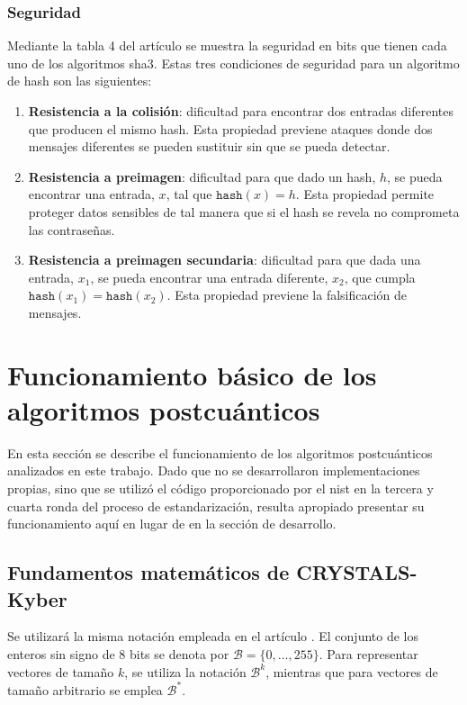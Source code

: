 \subsubsection{Seguridad}
Mediante la tabla 4 del artículo \cite{FIPS202} se muestra la seguridad en bits que tienen cada uno de los algoritmos \gls{sha}3. Estas tres condiciones de seguridad para un algoritmo de hash son las siguientes:
\begin{enumerate}
	\item \textbf{Resistencia a la colisión}: dificultad para encontrar dos entradas diferentes que producen el mismo hash. Esta propiedad previene ataques donde dos mensajes diferentes se pueden sustituir sin que se pueda detectar.
	\item \textbf{Resistencia a preimagen}: dificultad para que dado un hash, \(h\), se pueda encontrar una entrada, \(x\), tal que \(\texttt{hash}(x)=h\). Esta propiedad permite proteger datos sensibles de tal manera que si el hash se revela no comprometa las contraseñas. 
	\item \textbf{Resistencia a preimagen secundaria}: dificultad para que dada una entrada, \(x_1\), se pueda encontrar una entrada diferente, \(x_2\), que cumpla \(\texttt{hash}(x_1)=\texttt{hash}(x_2)\). Esta propiedad previene la falsificación de mensajes.
\end{enumerate}
\newpage



\section{Funcionamiento básico de los algoritmos postcuánticos}
En esta sección se describe el funcionamiento de los algoritmos postcuánticos analizados en este trabajo. Dado que no se desarrollaron implementaciones propias, sino que se utilizó el código proporcionado por el \gls{nist} en la tercera \cite{nistPQCround3} y cuarta \cite{nistPQCround4} ronda del proceso de estandarización, resulta apropiado presentar su funcionamiento aquí en lugar de en la sección de desarrollo.
\subsection{Fundamentos matemáticos de CRYSTALS-Kyber }
Se utilizará la misma notación empleada en el artículo \cite{kyber-spec-2021}. El conjunto de los enteros sin signo de 8 bits se denota por \(\mathcal{B} = \{0, \dots, 255\}\). Para representar vectores de tamaño \(k\), se utiliza la notación \(\mathcal{B}^k\), mientras que para vectores de tamaño arbitrario se emplea \(\mathcal{B}^*\).
\newline

